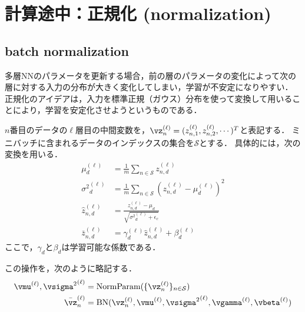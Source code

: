 \section{計算途中：正規化 (normalization)}
\subsection{batch normalization \cite{ioffe2015batch}}
多層NNのパラメータを更新する場合，前の層のパラメータの変化によって次の層に対する入力の分布が大きく変化してしまい，学習が不安定になりやすい．
正規化のアイデアは，入力を標準正規（ガウス）分布を使って変換して用いることにより，学習を安定化させようというものである．

$n$番目のデータの$\ell$層目の中間変数を，$\vz^{(\ell)}_n=(z^{(\ell)}_{n,1},z^{(\ell)}_{n,2},\cdots)^T$と表記する．
ミニバッチに含まれるデータのインデックスの集合を$\mathcal{S}$とする．
具体的には，次の変換を用いる．
\begin{align*}
\mu_{d}^{(\ell)} &= \frac{1}{m}\sum_{n\in\mathcal{S}}z^{(\ell)}_{n,d}
\\
{\sigma^2}^{(\ell)}_{d}
&=
\frac{1}{m} \sum_{n\in\mathcal{S}} (z^{(\ell)}_{n,d}-\mu_{d}^{(\ell)})^2
\\
\hat{z}^{(\ell)}_{n,d}
&=
\frac{z^{(\ell)}_{n,d}-\mu_{d}}
{\sqrt{{\sigma^2}^{(\ell)}_{d}+\epsilon_c}}
\\
\bar{z}^{(\ell)}_{n,d}
&=
\gamma^{(\ell)}_d \hat{z}^{(\ell)}_{n,d} + \beta^{(\ell)}_d
\end{align*}
ここで，$\gamma_d$と$\beta_d$は学習可能な係数である．

この操作を，次のように略記する．
\begin{align*}
\vmu^{(\ell)}, {\vsigma^2}^{(\ell)} &= \mbox{NormParam}(\{\vz^{(\ell)}_{n}\}_{n\in\mathcal{S}})
\\
\bar{\vz}^{(\ell)}_{n}
&=
\mbox{BN}(\vz^{(\ell)}_n,\vmu^{(\ell)}, {\vsigma^2}^{(\ell)},\vgamma^{(\ell)},\vbeta^{(\ell)})
\end{align*}

